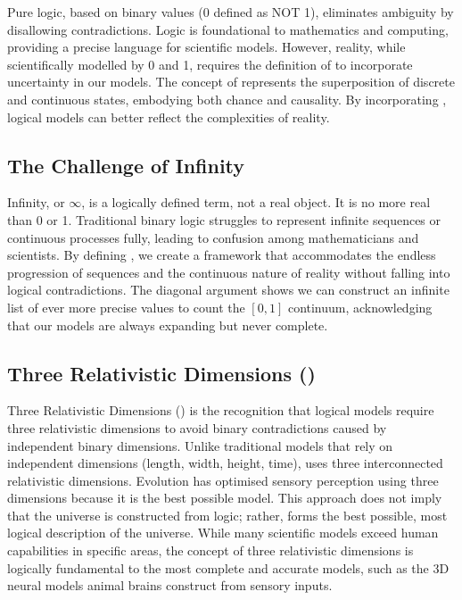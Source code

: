 \documentclass{article}
\begin{document}
Pure logic, based on binary values (0 defined as NOT 1), eliminates ambiguity by disallowing contradictions. Logic is foundational to mathematics and computing, providing a precise language for scientific models. However, reality, while scientifically modelled by 0 and 1, requires the definition of \qbit{} to incorporate uncertainty in our models. The concept of \qbit{} represents the superposition of discrete and continuous states, embodying both chance and causality. By incorporating \qbit{}, logical models can better reflect the complexities of reality.

\subsection*{The Challenge of Infinity}

Infinity, or \(\infty\), is a logically defined term, not a real object. It is no more real than 0 or 1. Traditional binary logic struggles to represent infinite sequences or continuous processes fully, leading to confusion among mathematicians and scientists. By defining \qbit{}, we create a framework that accommodates the endless progression of sequences and the continuous nature of reality without falling into logical contradictions. The diagonal argument shows we can construct an infinite list of ever more precise values to count the \([0,1]\) continuum, acknowledging that our models are always expanding but never complete.

\subsection*{Three Relativistic Dimensions (\iR{})}

Three Relativistic Dimensions (\iR{}) is the recognition that logical models require three relativistic dimensions to avoid binary contradictions caused by independent binary dimensions. Unlike traditional models that rely on independent dimensions (length, width, height, time), \iR{} uses three interconnected relativistic dimensions. Evolution has optimised sensory perception using three dimensions because it is the best possible model. This approach does not imply that the universe is constructed from logic; rather, \iR{} forms the best possible, most logical description of the universe. While many scientific models exceed human capabilities in specific areas, the concept of three relativistic dimensions is logically fundamental to the most complete and accurate models, such as the 3D neural models animal brains construct from sensory inputs.
\end{document}
